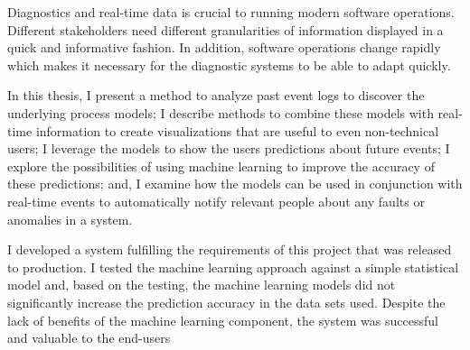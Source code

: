 


\begin{abstractpage}[english]
Diagnostics and real-time data is crucial to running modern software operations.
Different stakeholders need different granularities of information displayed in a quick and informative fashion.
In addition, software operations change rapidly which makes it necessary for the diagnostic systems to be able to adapt quickly.

\vspace{0.8ex}

In this thesis, I present a method to analyze past event logs to discover the underlying process models;
I describe methods to combine these models with real-time information to create visualizations
that are useful to even non-technical users;
I leverage the models to show the users predictions about future events;
I explore the possibilities of using machine learning to improve the accuracy of these predictions;
and, I examine how the models can be used in conjunction with real-time events to automatically notify relevant people about any faults or anomalies in a system.
 
\vspace{0.8ex}
 
I developed a system fulfilling the requirements of this project that was released to production.
I tested the machine learning approach against a simple statistical model and, based on the testing, the machine learning models did not significantly increase the prediction accuracy in the data sets used.
Despite the lack of benefits of the machine learning component, the system was successful and valuable to the end-users

\end{abstractpage}

\newpage


